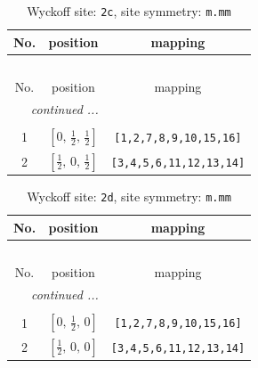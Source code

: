 \documentclass[fleqn,8pt]{jsarticle}
\begin{document}
\renewcommand{\arraystretch}{1.2}
\begin{longtable}{ccc}
\caption{Wyckoff site: {\tt 2c}, site symmetry: {\tt m.mm}}
 \\
 \hline \hline
No. & position & mapping \\ \hline \endfirsthead

\multicolumn{2}{l}{\tablename\ \thetable{}} \\
 \hline \hline
No. & position & mapping \\ \hline \endhead

 \hline \hline
\multicolumn{2}{r}{\footnotesize\it continued ...} \\ \endfoot

 \hline \hline
\multicolumn{2}{r}{} \\ \endlastfoot

1 & $\left[ 0,\, \frac{1}{2},\, \frac{1}{2} \right]$ & {\tt [1,2,7,8,9,10,15,16]} \\ \hline
2 & $\left[ \frac{1}{2},\, 0,\, \frac{1}{2} \right]$ & {\tt [3,4,5,6,11,12,13,14]} \\
\end{longtable}
\renewcommand{\arraystretch}{1.2}
\begin{longtable}{ccc}
\caption{Wyckoff site: {\tt 2d}, site symmetry: {\tt m.mm}}
 \\
 \hline \hline
No. & position & mapping \\ \hline \endfirsthead

\multicolumn{2}{l}{\tablename\ \thetable{}} \\
 \hline \hline
No. & position & mapping \\ \hline \endhead

 \hline \hline
\multicolumn{2}{r}{\footnotesize\it continued ...} \\ \endfoot

 \hline \hline
\multicolumn{2}{r}{} \\ \endlastfoot

1 & $\left[ 0,\, \frac{1}{2},\, 0 \right]$ & {\tt [1,2,7,8,9,10,15,16]} \\ \hline
2 & $\left[ \frac{1}{2},\, 0,\, 0 \right]$ & {\tt [3,4,5,6,11,12,13,14]} \\
\end{longtable}
\renewcommand{\arraystretch}{1.2}
\end{document}
